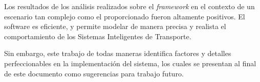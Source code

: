 Los resultados de los análisis realizados sobre el \emph{framework} en el contexto de un escenario tan complejo como el proporcionado fueron altamente positivos. El software es eficiente, y permite modelar de manera precisa y realista el comportamiento de los Sistemas Inteligentes de Transporte.

Sin embargo, este trabajo de todas maneras identifica factores y detalles perfeccionables en la implementación del sistema, los cuales se presentan al final de este documento como sugerencias para trabajo futuro. 